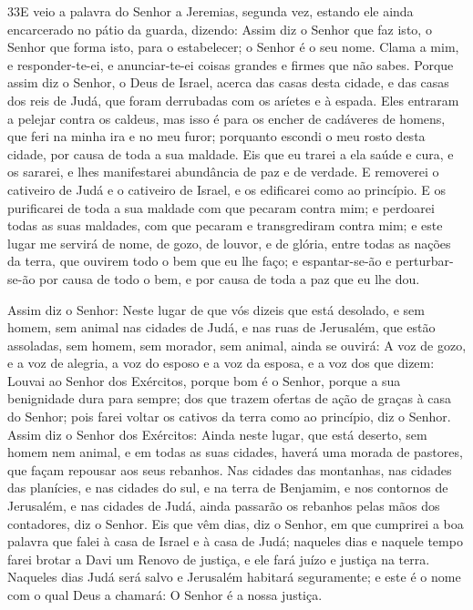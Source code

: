 \medskip

\lettrine{33} E veio a palavra do Senhor a Jeremias, segunda
vez, estando ele ainda encarcerado no pátio da guarda, dizendo:
Assim diz o Senhor que faz isto, o Senhor que forma isto, para o
estabelecer; o Senhor é o seu nome. Clama a mim, e
responder-te-ei, e anunciar-te-ei coisas grandes e firmes que não
sabes. Porque assim diz o Senhor, o Deus de Israel, acerca das
casas desta cidade, e das casas dos reis de Judá, que foram
derrubadas com os aríetes e à espada. Eles entraram a pelejar
contra os caldeus, mas isso é para os encher de cadáveres de homens,
que feri na minha ira e no meu furor; porquanto escondi o meu rosto
desta cidade, por causa de toda a sua maldade. Eis que eu trarei
a ela saúde e cura, e os sararei, e lhes manifestarei abundância de
paz e de verdade. E removerei o cativeiro de Judá e o cativeiro
de Israel, e os edificarei como ao princípio. E os purificarei
de toda a sua maldade com que pecaram contra mim; e perdoarei todas
as suas maldades, com que pecaram e transgrediram contra mim; e
este lugar me servirá de nome, de gozo, de louvor, e de glória,
entre todas as nações da terra, que ouvirem todo o bem que eu lhe
faço; e espantar-se-ão e perturbar-se-ão por causa de todo o bem, e
por causa de toda a paz que eu lhe dou.

Assim diz o Senhor: Neste lugar de que vós dizeis que está
desolado, e sem homem, sem animal nas cidades de Judá, e nas ruas de
Jerusalém, que estão assoladas, sem homem, sem morador, sem animal,
ainda se ouvirá: A voz de gozo, e a voz de alegria, a voz do
esposo e a voz da esposa, e a voz dos que dizem: Louvai ao Senhor
dos Exércitos, porque bom é o Senhor, porque a sua benignidade dura
para sempre; dos que trazem ofertas de ação de graças à casa do
Senhor; pois farei voltar os cativos da terra como ao princípio, diz
o Senhor. Assim diz o Senhor dos Exércitos: Ainda neste
lugar, que está deserto, sem homem nem animal, e em todas as suas
cidades, haverá uma morada de pastores, que façam repousar aos seus
rebanhos. Nas cidades das montanhas, nas cidades das
planícies, e nas cidades do sul, e na terra de Benjamim, e nos
contornos de Jerusalém, e nas cidades de Judá, ainda passarão os
rebanhos pelas mãos dos contadores, diz o Senhor. Eis que vêm
dias, diz o Senhor, em que cumprirei a boa palavra que falei à casa
de Israel e à casa de Judá; naqueles dias e naquele tempo
farei brotar a Davi um Renovo de justiça, e ele fará juízo e justiça
na terra. Naqueles dias Judá será salvo e Jerusalém habitará
seguramente; e este é o nome com o qual Deus a chamará: O Senhor é a
nossa justiça.

